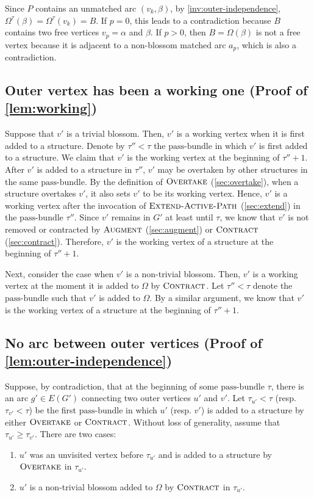 \documentclass{article}
\newcommand{\alp}{\alpha}
\newcommand{\Omg}{\Omega}
\newcommand{\bundle}{\text{pass-bundle}\xspace}
\newcommand{\algExtend}{\textsc{Extend-Active-Path}\xspace}
\newcommand{\algOvertake}{\textsc{Overtake}\xspace}
\newcommand{\algAugment}{\textsc{Augment}\xspace}
\newcommand{\algContract}{\textsc{Contract}\xspace}
\begin{document}
    Since $P$ contains an unmatched arc $(v_k, \beta)$, by \cref{inv:outer-independence}, $\Omg^\tau(\beta) = \Omg^\tau(v_k) = B$.
    If $p = 0$, this leads to a contradiction because $B$ contains two free vertices $v_p = \alp$ and $\beta$. If $p > 0$, then $B = \Omg(\beta)$ is not a free vertex because it is adjacent to a non-blossom matched arc $a_p$, which is also a contradiction. 


\subsection{Outer vertex has been a working one (Proof of \cref{lem:working})}
\label{sec:lem:working}
Suppose that $v'$ is a trivial blossom.
Then, $v'$ is a working vertex when it is first added to a structure.
Denote by $\tau'' < \tau$ the $\bundle$ in which $v'$ is first added to a structure.
We claim that $v'$ is the working vertex at the beginning of $\tau'' + 1$.
After $v'$ is added to a structure in $\tau''$, $v'$ may be overtaken by other structures in the same $\bundle$.
By the definition of $\algOvertake$ (\cref{sec:overtake}), when a structure overtakes $v'$, it also sets $v'$ to be its working vertex.
Hence, $v'$ is a working vertex after the invocation of $\algExtend$ (\cref{sec:extend}) in the $\bundle$ $\tau''$.
Since $v'$ remains in $G'$ at least until $\tau$, we know that $v'$ is not removed or contracted by $\algAugment$ (\cref{sec:augment}) or $\algContract$ (\cref{sec:contract}).
Therefore, $v'$ is the working vertex of a structure at the beginning of $\tau'' + 1$.

Next, consider the case when $v'$ is a non-trivial blossom. Then, $v'$ is a working vertex at the moment it is added to $\Omg$ by $\algContract$. Let $\tau'' < \tau$ denote the $\bundle$ such that $v'$ is added to $\Omg$. By a similar argument, we know that $v'$ is the working vertex of a structure at the beginning of $\tau'' + 1$.


\subsection{No arc between outer vertices (Proof of \cref{lem:outer-independence})}
\label{sec:lem:outer-independence}
Suppose, by contradiction, that at the beginning of some $\bundle$ $\tau$, there is an arc $g' \in E(G')$ connecting two outer vertices $u'$ and $v'$. Let $\tau_{u'} < \tau$ (resp. $\tau_{v'} < \tau$) be the first $\bundle$ in which $u'$ (resp. $v'$) is added to a structure by either $\algOvertake$ or $\algContract$. Without loss of generality, assume that $\tau_{u'} \geq \tau_{v'}$. There are two cases:
\begin{enumerate}
    \item $u'$ was an unvisited vertex before $\tau_{u'}$ and is added to a structure by $\algOvertake$ in $\tau_{u'}$.
    \item $u'$ is a non-trivial blossom added to $\Omg$ by $\algContract$ in $\tau_{u'}$. 
\end{enumerate}
\end{document}
